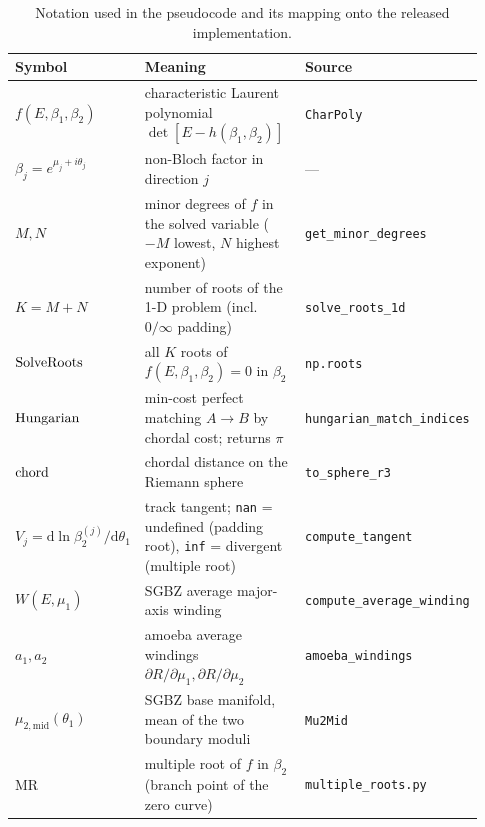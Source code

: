 \begin{table}[htb]
\centering
\setlength{\tabcolsep}{4pt}
\begin{tabular}{@{}p{0.16\linewidth}p{0.52\linewidth}p{0.25\linewidth}@{}}
\toprule
Symbol & Meaning & Source \\
\midrule
$f(E,\beta_1,\beta_2)$ & characteristic Laurent polynomial $\det[E-h(\beta_1,\beta_2)]$ & \texttt{CharPoly} \\
$\beta_j=e^{\mu_j+i\theta_j}$ & non-Bloch factor in direction $j$ & --- \\
$M,N$ & minor degrees of $f$ in the solved variable ($-M$ lowest, $N$ highest exponent) & \texttt{get\_minor\_\allowbreak degrees} \\
$K=M+N$ & number of roots of the 1-D problem (incl.\ $0/\infty$ padding) & \texttt{solve\_roots\_\allowbreak 1d} \\
$\mathrm{SolveRoots}$ & all $K$ roots of $f(E,\beta_1,\beta_2)=0$ in $\beta_2$ & \texttt{np.roots} \\
$\mathrm{Hungarian}$ & min-cost perfect matching $A\to B$ by chordal cost; returns $\pi$ & \texttt{hungarian\_\allowbreak match\_\allowbreak indices} \\
$\mathrm{chord}$ & chordal distance on the Riemann sphere & \texttt{to\_sphere\_\allowbreak r3} \\
$V_j=\mathrm{d}\ln\beta_2^{(j)}/\mathrm{d}\theta_1$ & track tangent; \texttt{nan} = undefined (padding root), \texttt{inf} = divergent (multiple root) & \texttt{compute\_\allowbreak tangent} \\
$W(E,\mu_1)$ & SGBZ average major-axis winding & \texttt{compute\_\allowbreak average\_\allowbreak winding} \\
$a_1,a_2$ & amoeba average windings $\partial R/\partial\mu_1,\partial R/\partial\mu_2$ & \texttt{amoeba\_\allowbreak windings} \\
$\mu_{2,\mathrm{mid}}(\theta_1)$ & SGBZ base manifold, mean of the two boundary moduli & \texttt{Mu2Mid} \\
MR & multiple root of $f$ in $\beta_2$ (branch point of the zero curve) & \texttt{multiple\_\allowbreak roots.py} \\
\bottomrule
\end{tabular}
\caption{Notation used in the pseudocode and its mapping onto the released implementation.}
\label{tab:pseudo-notation}
\end{table}

